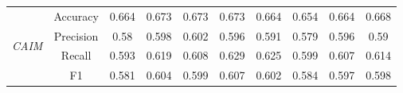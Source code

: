 \begin{table}[H]
\begin{tabular}{|c|c|c|c|c|c|c|c|c|c|}
        \multirow{4}{*}{\textit{CAIM}}  & Accuracy & 0.664 & 0.673 & 0.673 & 0.673 & 0.664 & 0.654 & 0.664 & 0.668 \\ \cline{2-10}
                                     & Precision & 0.58 & 0.598 & 0.602 & 0.596 & 0.591 & 0.579 & 0.596 & 0.59 \\ \cline{2-10}
                                     & Recall & 0.593 & 0.619 & 0.608 & 0.629 & 0.625 & 0.599 & 0.607 & 0.614 \\ \cline{2-10}
                                     & F1 & 0.581 & 0.604 & 0.599 & 0.607 & 0.602 & 0.584 & 0.597 & 0.598 \\ \hline \hline

            \hline
    \end{tabular}
\end{table}
